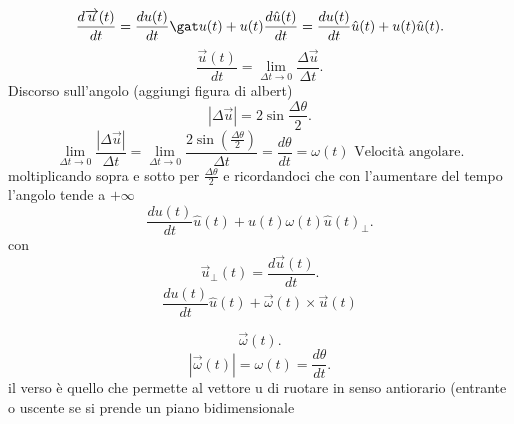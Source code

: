 \documentclass[12px]{article}
\begin{document}
	\[
		\frac{d \overrightarrow{u}(t)}{dt} = \frac{du(t)}{dt}\gat u (t) + u (t)  \frac{d \hat u (t)}{dt} = \frac{d u(t)}{dt} \hat u (t)  + u (t) \hat u (t)
	.\] 
	\[
		\frac{\overrightarrow{u} (t)}{dt} = \lim_{\Delta t \rightarrow 0}\frac{\Delta \overrightarrow{u}}{\Delta t}
	.\] 
	Discorso sull'angolo (aggiungi figura di albert)
	\[
		|\Delta \overrightarrow{u}| = 2 \sin \frac{\Delta \theta}{2}
	.\] 
	\[
		\lim_{\Delta t \rightarrow 0} \frac{|\Delta \overrightarrow{u}|}{\Delta t}= \lim_{\Delta t \rightarrow 0} \frac{2\sin(\frac{\Delta\theta} 2)} {\Delta t} = \frac{d\theta}{dt} = \omega (t) \text{ Velocità angolare}
	.\] 
	moltiplicando sopra e sotto per $\frac {\Delta \theta} 2$ e ricordandoci che con l'aumentare del tempo l'angolo tende a $+\infty$
	\[
		\frac{d u(t)}{dt} \hat u (t) + u(t)\omega (t)\hat u(t)_\perp
	.\] 
	con
	\[
		\overrightarrow{u}_\perp (t) = \frac{d\overrightarrow u(t)}{dt}
	.\] 
	\[
	\frac{du(t)}{dt}\hat u(t) + \overrightarrow{\omega}(t)\times \overrightarrow{u}(t)\]
		\begin{defi}
			\[
			 \overrightarrow{\omega}(t)
			.\]
			\[
				|\overrightarrow{\omega}(t)| = \omega (t) = \frac {d\theta}{dt}
			.\] 
			il verso è quello che permette al vettore u di ruotare in senso antiorario (entrante o uscente se si prende un piano bidimensionale
		\end{defi}
\end{document}
